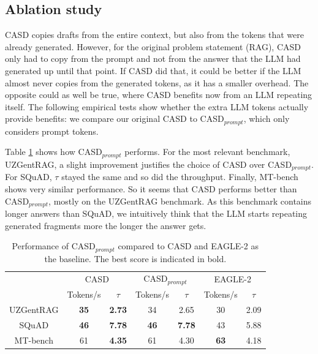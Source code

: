 \subsection{Ablation study}

CASD copies drafts from the entire context, but also from the tokens that were already generated. However, for the original problem statement (RAG), CASD only had to copy from the prompt and not from the answer that the LLM had generated up until that point. If CASD did that, it could be better if the LLM almost never copies from the generated tokens, as it has a smaller overhead. The opposite could as well be true, where CASD benefits now from an LLM repeating itself. The following empirical tests show whether the extra LLM tokens actually provide benefits: we compare our original CASD to CASD$_{prompt}$, which only considers prompt tokens.

Table \ref{tab:ablation_benchmarks} shows how CASD$_{prompt}$ performs. For the most relevant benchmark, UZGentRAG, a slight improvement justifies the choice of CASD over CASD$_{prompt}$. For SQuAD, $\tau$ stayed the same and so did the throughput. Finally, MT-bench shows very similar performance. So it seems that CASD performs better than CASD$_{prompt}$, mostly on the UZGentRAG benchmark. As this benchmark contains longer answers than SQuAD, we intuitively think that the LLM starts repeating generated fragments more the longer the answer gets.

\begin{table}[h]
  \centering
  \begin{tabular}{ccc|cc|cc}
      & \multicolumn{2}{c}{CASD} & \multicolumn{2}{c}{CASD$_{prompt}$} & \multicolumn{2}{c}{EAGLE-2} \\
      \cline{2-7}
      & Tokens/s & $\tau$ & Tokens/s & $\tau$ & Tokens/s & $\tau$ \\
      \hline
      UZGentRAG & \textbf{35} & \textbf{2.73} & 34 & 2.65 & 30 & 2.09 \\
      SQuAD     & \textbf{46} & \textbf{7.78} & \textbf{46} & \textbf{7.78} & 43 & 5.88 \\
      MT-bench  & 61 & \textbf{4.35} & 61 & 4.30 & \textbf{63} & 4.18 \\
      \hline
  \end{tabular}
  \caption{Performance of CASD$_{prompt}$ compared to CASD and EAGLE-2 as the baseline. The best score is indicated in bold.}
  \label{tab:ablation_benchmarks}
\end{table}

